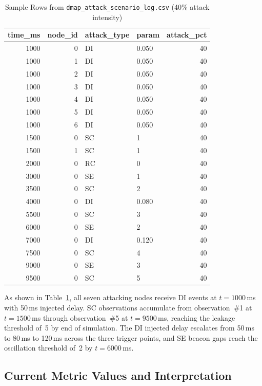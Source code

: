 \begin{table}[htb]
\centering
\caption{Sample Rows from
\texttt{dmap\_attack\_scenario\_log.csv}
(40\% attack intensity)}
\label{tab:attack_log_sample}
\scriptsize
\setlength{\tabcolsep}{5pt}
\begin{tabular}{rrllr}
\hline
\textbf{time\_ms} & \textbf{node\_id} &
\textbf{attack\_type} & \textbf{param} &
\textbf{attack\_pct} \\
\hline
1000 & 0 & DI & 0.050 & 40 \\
1000 & 1 & DI & 0.050 & 40 \\
1000 & 2 & DI & 0.050 & 40 \\
1000 & 3 & DI & 0.050 & 40 \\
1000 & 4 & DI & 0.050 & 40 \\
1000 & 5 & DI & 0.050 & 40 \\
1000 & 6 & DI & 0.050 & 40 \\
1500 & 0 & SC & 1     & 40 \\
1500 & 1 & SC & 1     & 40 \\
2000 & 0 & RC & 0     & 40 \\
3000 & 0 & SE & 1     & 40 \\
3500 & 0 & SC & 2     & 40 \\
4000 & 0 & DI & 0.080 & 40 \\
5500 & 0 & SC & 3     & 40 \\
6000 & 0 & SE & 2     & 40 \\
7000 & 0 & DI & 0.120 & 40 \\
7500 & 0 & SC & 4     & 40 \\
9000 & 0 & SE & 3     & 40 \\
9500 & 0 & SC & 5     & 40 \\
\hline
\end{tabular}
\end{table}

As shown in Table~\ref{tab:attack_log_sample}, all
seven attacking nodes receive DI events at
$t{=}1000$\,ms with 50\,ms injected delay. SC
observations accumulate from observation~\#1 at
$t{=}1500$\,ms through observation~\#5 at
$t{=}9500$\,ms, reaching the leakage threshold of~5
by end of simulation. The DI injected delay escalates
from 50\,ms to 80\,ms to 120\,ms across the three
trigger points, and SE beacon gaps reach the
oscillation threshold of~2 by $t{=}6000$\,ms.

\subsection{Current Metric Values and Interpretation}

